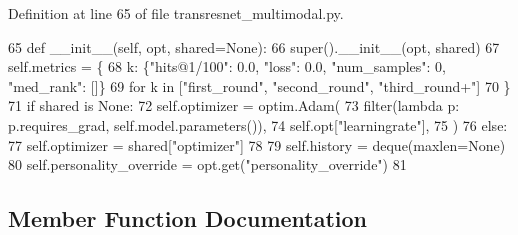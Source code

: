 Definition at line 65 of file transresnet\+\_\+multimodal.\+py.


\begin{DoxyCode}
65     \textcolor{keyword}{def }\_\_init\_\_(self, opt, shared=None):
66         super().\_\_init\_\_(opt, shared)
67         self.metrics = \{
68             k: \{\textcolor{stringliteral}{"hits@1/100"}: 0.0, \textcolor{stringliteral}{"loss"}: 0.0, \textcolor{stringliteral}{"num\_samples"}: 0, \textcolor{stringliteral}{"med\_rank"}: []\}
69             \textcolor{keywordflow}{for} k \textcolor{keywordflow}{in} [\textcolor{stringliteral}{"first\_round"}, \textcolor{stringliteral}{"second\_round"}, \textcolor{stringliteral}{"third\_round+"}]
70         \}
71         \textcolor{keywordflow}{if} shared \textcolor{keywordflow}{is} \textcolor{keywordtype}{None}:
72             self.optimizer = optim.Adam(
73                 filter(\textcolor{keyword}{lambda} p: p.requires\_grad, self.model.parameters()),
74                 self.opt[\textcolor{stringliteral}{"learningrate"}],
75             )
76         \textcolor{keywordflow}{else}:
77             self.optimizer = shared[\textcolor{stringliteral}{"optimizer"}]
78 
79         self.history = deque(maxlen=\textcolor{keywordtype}{None})
80         self.personality\_override = opt.get(\textcolor{stringliteral}{"personality\_override"})
81 
\end{DoxyCode}


\subsection{Member Function Documentation}
\mbox{\label{classprojects_1_1image__chat_1_1transresnet__multimodal_1_1transresnet__multimodal_1_1TransresnetMultimodalAgent_a79a0a51097fb1cb89751a17879b519e1}} 
